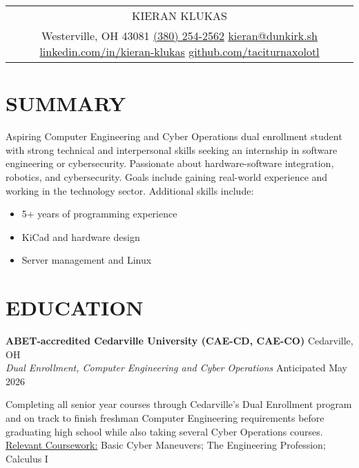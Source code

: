 \documentclass[a4paper,10pt]{article}
\begin{document}
\pagestyle{empty}

\begin{tabularx}{\linewidth}{@{} C @{}}
\Huge{KIERAN KLUKAS} \\[8pt]
\raggedright
Westerville, OH 43081 \textbar{} \href{tel:+13802542562}{(380) 254-2562} \textbar{} \href{mailto:kieran@dunkirk.sh}{kieran@dunkirk.sh} \textbar{} \href{https://linkedin.com/in/kieran-klukas}{linkedin.com/in/kieran-klukas} \textbar{} \href{https://github.com/taciturnaxolotl}{github.com/taciturnaxolotl}
\end{tabularx}

\section{SUMMARY}
Aspiring Computer Engineering and Cyber Operations dual enrollment student with strong technical and interpersonal skills seeking an internship in software engineering or cybersecurity. Passionate about hardware-software integration, robotics, and cybersecurity. Goals include gaining real-world experience and working in the technology sector. Additional skills include:
\begin{itemize}[nosep,leftmargin=1em,itemsep=1pt,label=--]
  \item 5+ years of programming experience
  \item KiCad and hardware design
  \item Server management and Linux
\end{itemize}

\section{EDUCATION}
\textbf{ABET-accredited Cedarville University (CAE-CD, CAE-CO)} \hfill Cedarville, OH\\
\textit{Dual Enrollment, Computer Engineering and Cyber Operations} \hfill Anticipated May 2026\\
\begin{minipage}{0.8\textwidth}
  Completing all senior year courses through Cedarville’s Dual Enrollment program and on track to finish freshman Computer Engineering requirements before graduating high school while also taking several Cyber Operations courses.\\
  \underline{Relevant Coursework:} Basic Cyber Maneuvers; The Engineering Profession; Calculus I
\end{minipage}
\end{document}
